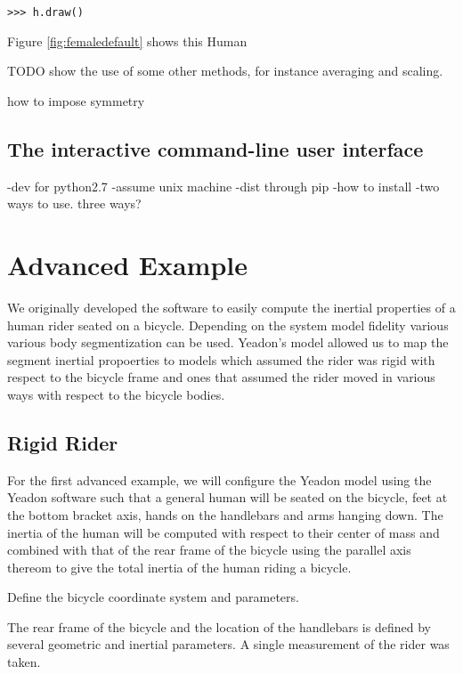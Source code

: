 \documentclass[10pt]{article}
\begin{document}
\begin{verbatim}
>>> h.draw()
\end{verbatim}

Figure \ref{fig:femaledefault} shows this Human

TODO show the use of some other methods, for instance averaging and scaling.

how to impose symmetry

\subsection*{The interactive command-line user interface}


-dev for python2.7
-assume unix machine
-dist through pip
-how to install
-two ways to use. three ways?


\section*{Advanced Example}
We originally developed the software to easily compute the inertial properties
of a human rider seated on a bicycle. Depending on the system model fidelity
various various body segmentization can be used. Yeadon's model allowed us to
map the segment inertial propoerties to models which assumed the rider was
rigid with respect to the bicycle frame and ones that assumed the rider moved
in various ways with respect to the bicycle bodies.

\subsection*{Rigid Rider}
For the first advanced example, we will configure the Yeadon model using the
Yeadon software such that a general human will be seated on the bicycle, feet
at the bottom bracket axis, hands on the handlebars and arms hanging down. The
inertia of the human will be computed with respect to their center of mass and
combined with that of the rear frame of the bicycle using the parallel axis
thereom to give the total inertia of the human riding a bicycle.

Define the bicycle coordinate system and parameters.

The rear frame of the bicycle  and the location of the handlebars is defined by
several geometric and inertial parameters. A single measurement of the rider
was taken.
\end{document}
